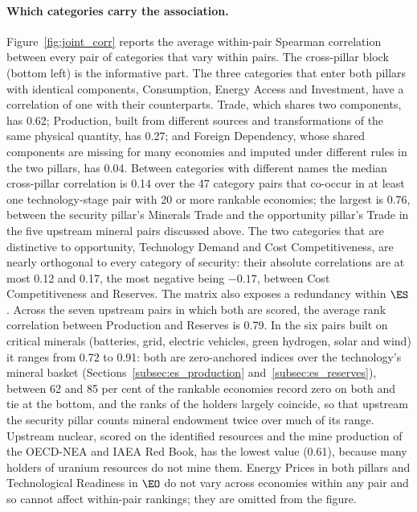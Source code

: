 \paragraph{Which categories carry the association.} Figure~\ref{fig:joint_corr} reports the
average within-pair Spearman correlation between every pair of categories that vary within
pairs. The cross-pillar block (bottom left) is the informative part. The three categories that
enter both pillars with identical components, Consumption, Energy Access and Investment, have a
correlation of one with their counterparts. Trade, which shares two components, has 0.62;
Production, built from different sources and transformations of the same physical quantity, has
0.27; and Foreign Dependency, whose shared components are missing for many economies and imputed
under different rules in the two pillars, has 0.04. Between categories with different names the
median cross-pillar correlation is 0.14 over the 47 category pairs that co-occur in at least one
technology-stage pair with 20 or more rankable economies; the largest is 0.76, between the
security pillar's Minerals Trade and the opportunity pillar's Trade in the five upstream mineral
pairs discussed above. The two categories that are distinctive to opportunity, Technology Demand
and Cost Competitiveness, are nearly orthogonal to every category of security: their absolute
correlations are at most 0.12 and 0.17, the most negative being $-0.17$, between Cost
Competitiveness and Reserves. The matrix also exposes a redundancy within $\ES$. Across the
seven upstream pairs in which both are scored, the average rank correlation between Production
and Reserves is 0.79. In the six pairs built on critical minerals (batteries, grid, electric
vehicles, green hydrogen, solar and wind) it ranges from 0.72 to 0.91: both are zero-anchored
indices over the technology's mineral basket (Sections~\ref{subsec:es_production}
and~\ref{subsec:es_reserves}), between 62 and 85 per cent of the rankable economies record zero
on both and tie at the bottom, and the ranks of the holders largely coincide, so that upstream
the security pillar counts mineral endowment twice over much of its range. Upstream nuclear,
scored on the identified resources and the mine production of the OECD-NEA and IAEA Red Book, has
the lowest value (0.61), because many holders of uranium resources do not mine them. Energy
Prices in both pillars and Technological Readiness in $\EO$ do not vary across economies within
any pair and so cannot affect within-pair rankings; they are omitted from the figure.

